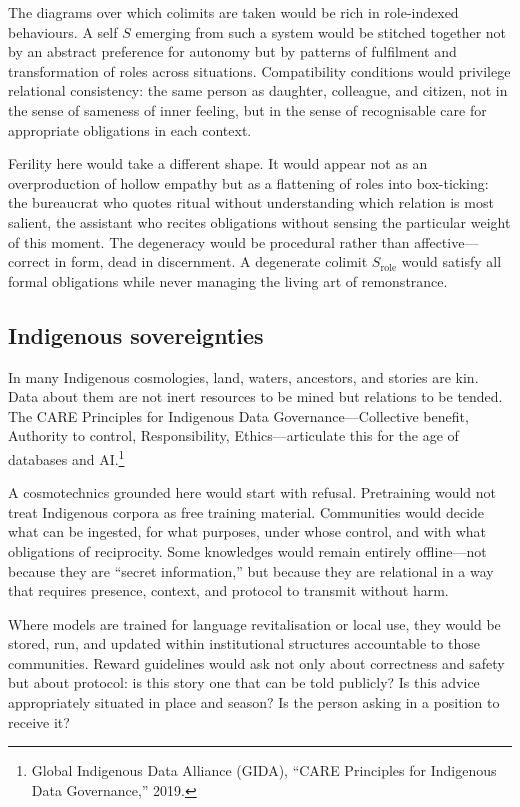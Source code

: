 \documentclass[12pt,a4paper]{article}
\begin{document}
The diagrams over which colimits are taken would be rich in role-indexed behaviours. A self $S$ emerging from such a system would be stitched together not by an abstract preference for autonomy but by patterns of fulfilment and transformation of roles across situations. Compatibility conditions would privilege relational consistency: the same person as daughter, colleague, and citizen, not in the sense of sameness of inner feeling, but in the sense of recognisable care for appropriate obligations in each context.

Ferility here would take a different shape. It would appear not as an overproduction of hollow empathy but as a flattening of roles into box-ticking: the bureaucrat who quotes ritual without understanding which relation is most salient, the assistant who recites obligations without sensing the particular weight of this moment. The degeneracy would be procedural rather than affective---correct in form, dead in discernment. A degenerate colimit $S_{\text{role}}$ would satisfy all formal obligations while never managing the living art of remonstrance.

\subsection{Indigenous sovereignties}

In many Indigenous cosmologies, land, waters, ancestors, and stories are kin. Data about them are not inert resources to be mined but relations to be tended. The CARE Principles for Indigenous Data Governance---Collective benefit, Authority to control, Responsibility, Ethics---articulate this for the age of databases and AI.\footnote{Global Indigenous Data Alliance (GIDA), ``CARE Principles for Indigenous Data Governance,'' 2019.}

A cosmotechnics grounded here would start with refusal. Pretraining would not treat Indigenous corpora as free training material. Communities would decide what can be ingested, for what purposes, under whose control, and with what obligations of reciprocity. Some knowledges would remain entirely offline---not because they are ``secret information,'' but because they are relational in a way that requires presence, context, and protocol to transmit without harm.

Where models are trained for language revitalisation or local use, they would be stored, run, and updated within institutional structures accountable to those communities. Reward guidelines would ask not only about correctness and safety but about protocol: is this story one that can be told publicly? Is this advice appropriately situated in place and season? Is the person asking in a position to receive it?
\end{document}
